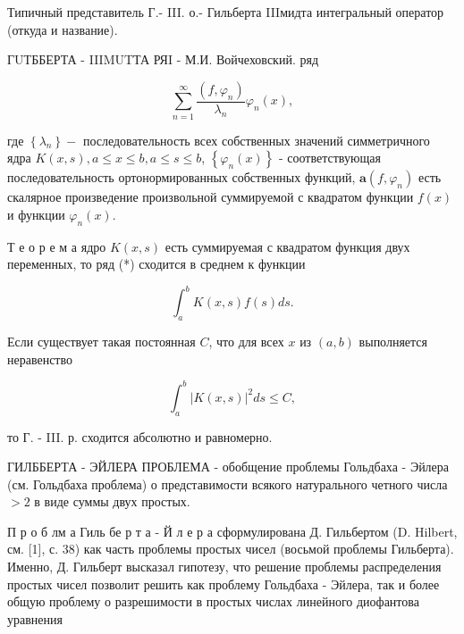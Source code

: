 \documentclass[10pt]{article}
\begin{document}
Типичный представитель Г.- III. о.- Гильберта IIIмидта интегральный оператор (откуда и название).



ГUТББЕРТА - IIIMUTТА РЯI - М.И. Войчеховский. ряд



\[

\sum_{n=1}^{\infty} \frac{\left(f, \varphi_{n}\right)}{\lambda_{n}} \varphi_{n}(x),

\]



где $\left\{\lambda_{n}\right\}-$ последовательность всех собственных значений симметричного ядра $K(x, s), a \leqslant x \leqslant b, a \leqslant s \leqslant b$, $\left\{\varphi_{n}(x)\right\}$ - соответствующая последовательность ортонормированных собственных функций, $\mathbf{a}\left(f, \varphi_{n}\right)$ есть скалярное произведение произвольной суммируемой с квадратом функции $f(x)$ и функции $\varphi_{n}(x)$.



Т е о р е м а ядро $K(x, s)$ есть суммируемая с квадратом функция двух переменных, то ряд (*) сходится в среднем к функции



\[

\int_{a}^{b} K(x, s) f(s) d s .

\]



Если существует такая постоянная $C$, что для всех $x$ из $(a, b)$ выполняется неравенство



\[

\int_{a}^{b}|K(x, s)|^{2} d s \leqslant C,

\]



то Г. - III. р. сходится абсолютно и равномерно.



ГИЛББЕРТА - ЭЙЛЕРА ПРОБЛЕМА - обобщение проблемы Гольдбаха - Эйлера (см. Гольдбаха проблема) о представимости всякого натурального четного числа $>2$ в виде суммы двух простых.



П р о б лм а Гиль бе р т а - Й л е р а сформулирована Д. Гильбертом (D. Hilbert, см. [1], с. 38) как часть проблемы простых чисел (восьмой проблемы Гильберта). Именно, Д. Гильберт высказал гипотезу, что решение проблемы распределения простых чисел позволит решить как проблему Гольдбаха - Эйлера, так и более общую проблему о разрешимости в простых числах линейного диофантова уравнения
\end{document}
